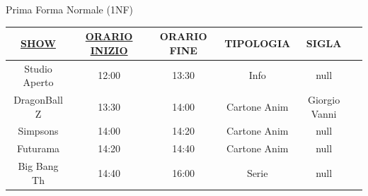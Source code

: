 %
\begin{frame}{Prima Forma Normale (1NF)}
\begin{table}[h]
    \centering
    \begin{tabular}{|c|c|c|c|c|c|}
        \hline
        \rowcolor{cyan!30} \textbf{\underline{SHOW}} & \textbf{\underline{ORARIO INIZIO}} & \textbf{ORARIO FINE} & \textbf{TIPOLOGIA} & \textbf{SIGLA} \\ \hline
        Studio Aperto & 12:00 & 13:30 & Info & null \\ \hline
        DragonBall Z & 13:30 & 14:00 & Cartone Anim & Giorgio Vanni \\ \hline
        Simpsons & 14:00 & 14:20 & Cartone Anim & null \\ \hline
        Futurama & 14:20 & 14:40 & Cartone Anim & null \\ \hline
        Big Bang Th & 14:40 & 16:00 & Serie & null \\ \hline
    \end{tabular}
\end{table}
\end{frame}
%
%
